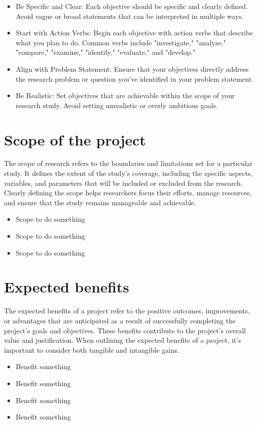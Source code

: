 \begin{itemize}
    \item Be Specific and Clear:
    Each objective should be specific and clearly defined. Avoid vague or broad statements that can be interpreted in multiple ways.

    \item Start with Action Verbs:
    Begin each objective with action verbs that describe what you plan to do. Common verbs include "investigate," "analyze," "compare," "examine," "identify," "evaluate," and "develop."

    \item Align with Problem Statement:
    Ensure that your objectives directly address the research problem or question you've identified in your problem statement.

    \item Be Realistic:
    Set objectives that are achievable within the scope of your research study. Avoid setting unrealistic or overly ambitious goals. 
\end{itemize}

\section{Scope of the project}
\label{Sec:ScopeOfWork}
The scope of research refers to the boundaries and limitations set for a particular study. It defines the extent of the study's coverage, including the specific aspects, variables, and parameters that will be included or excluded from the research. Clearly defining the scope helps researchers focus their efforts, manage resources, and ensure that the study remains manageable and achievable. 
\begin{itemize}
    \item Scope to do something
    \item Scope to do something
    \item Scope to do something
\end{itemize}

\section{Expected benefits}
\label{Sec:ExpectedBenefit}
The expected benefits of a project refer to the positive outcomes, improvements, or advantages that are anticipated as a result of successfully completing the project's goals and objectives. These benefits contribute to the project's overall value and justification. When outlining the expected benefits of a project, it's important to consider both tangible and intangible gains. 
\begin{itemize}
    \item Benefit something 
    \item Benefit something
    \item Benefit something
    \item Benefit something
\end{itemize}

